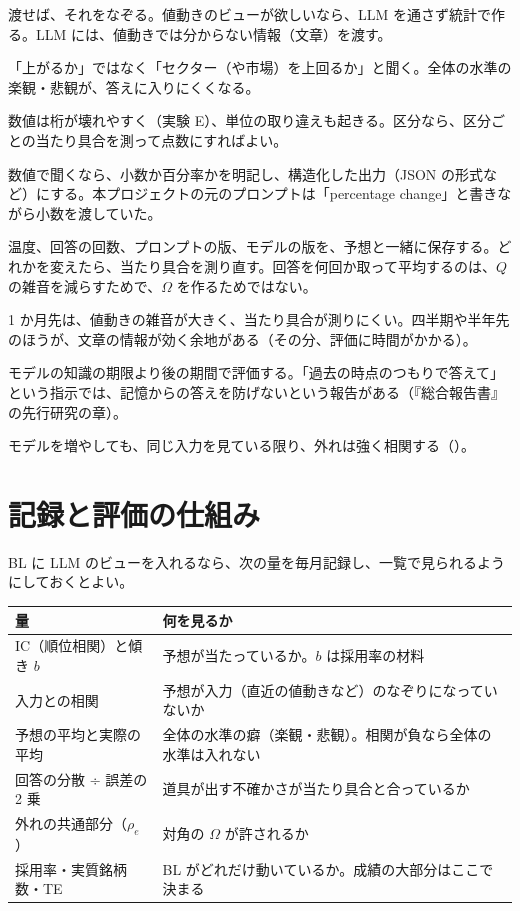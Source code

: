 \begin{description}[leftmargin=2em,style=nextline]
\item[直近の値動きだけを渡さない] 渡せば、それをなぞる。値動きのビューが欲しいなら、LLM を通さず統計で作る。LLM には、値動きでは分からない情報（文章）を渡す。
\item[相対で聞く] 「上がるか」ではなく「セクター（や市場）を上回るか」と聞く。全体の水準の楽観・悲観が、答えに入りにくくなる。
\item[数値より順位や区分で聞く] 数値は桁が壊れやすく（実験 E）、単位の取り違えも起きる。区分なら、区分ごとの当たり具合を測って点数にすればよい。
\item[単位と形式をはっきりさせる] 数値で聞くなら、小数か百分率かを明記し、構造化した出力（JSON の形式など）にする。本プロジェクトの元のプロンプトは「percentage change」と書きながら小数を渡していた。
\item[温度と回数を固定し、記録する] 温度、回答の回数、プロンプトの版、モデルの版を、予想と一緒に保存する。どれかを変えたら、当たり具合を測り直す。回答を何回か取って平均するのは、$Q$ の雑音を減らすためで、$\Omega$ を作るためではない。
\item[予想の期間を考える] 1 か月先は、値動きの雑音が大きく、当たり具合が測りにくい。四半期や半年先のほうが、文章の情報が効く余地がある（その分、評価に時間がかかる）。
\item[未来の情報を混ぜない] モデルの知識の期限より後の期間で評価する。「過去の時点のつもりで答えて」という指示では、記憶からの答えを防げないという報告がある（『総合報告書』の先行研究の章）。
\item[複数のモデルは、外れの相関を測ってからまとめる] モデルを増やしても、同じ入力を見ている限り、外れは強く相関する（）。
\end{description}

\section{記録と評価の仕組み}

BL に LLM のビューを入れるなら、次の量を毎月記録し、一覧で見られるようにしておくとよい。

\begin{center}
\small
\begin{tabular}{p{4.0cm}p{9.6cm}}
\toprule
量 & 何を見るか \\
\midrule
IC（順位相関）と傾き $b$ & 予想が当たっているか。$b$ は採用率の材料 \\
入力との相関 & 予想が入力（直近の値動きなど）のなぞりになっていないか \\
予想の平均と実際の平均 & 全体の水準の癖（楽観・悲観）。相関が負なら全体の水準は入れない \\
回答の分散 ÷ 誤差の 2 乗 & 道具が出す不確かさが当たり具合と合っているか \\
外れの共通部分（$\rho_e$） & 対角の $\Omega$ が許されるか \\
採用率・実質銘柄数・TE & BL がどれだけ動いているか。成績の大部分はここで決まる \\
\bottomrule
\end{tabular}
\end{center}

